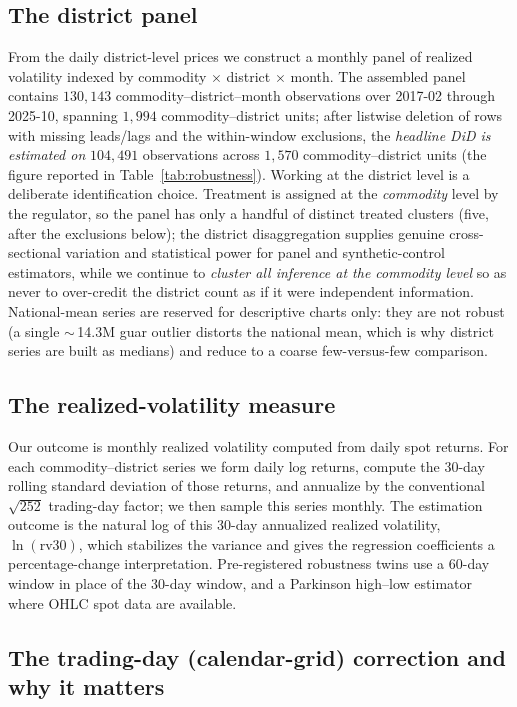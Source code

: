 \subsection{The district panel}

From the daily district-level prices we construct a monthly panel of realized volatility indexed by
commodity $\times$ district $\times$ month. The assembled panel contains $130{,}143$
commodity--district--month observations over 2017-02 through 2025-10, spanning $1{,}994$
commodity--district units; after listwise deletion of rows with missing leads/lags and the
within-window exclusions, the \emph{headline DiD is estimated on} $104{,}491$ observations across
$1{,}570$ commodity--district units (the figure reported in Table~\ref{tab:robustness}).
Working at the district level is a deliberate
identification choice. Treatment is assigned at the \emph{commodity} level by the regulator, so the
panel has only a handful of distinct treated clusters (five, after the exclusions below); the
district disaggregation supplies genuine cross-sectional variation and statistical power for
panel and synthetic-control estimators, while we continue to \emph{cluster all inference at the
commodity level} so as never to over-credit the district count as if it were independent
information. National-mean series are reserved for descriptive charts only: they are not robust (a
single $\sim$\,\rupee14.3M guar outlier distorts the national mean, which is why district series are
built as medians) and reduce to a coarse few-versus-few comparison.

\subsection{The realized-volatility measure}

Our outcome is monthly realized volatility computed from daily spot returns. For each
commodity--district series we form daily log returns, compute the 30-day rolling standard deviation
of those returns, and annualize by the conventional $\sqrt{252}$ trading-day factor; we then sample
this series monthly. The estimation outcome is the natural log of this 30-day annualized realized
volatility, $\ln(\mathrm{rv30})$, which stabilizes the variance and gives the regression
coefficients a percentage-change interpretation. Pre-registered robustness twins use a 60-day window
in place of the 30-day window, and a Parkinson high--low estimator where OHLC spot data are
available.

\subsection{The trading-day (calendar-grid) correction and why it matters}

